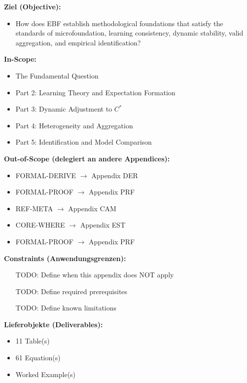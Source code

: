 \begin{tcolorbox}[
    colback=orange!5!white,
    colframe=orange!75!black,
    title={\textbf{Appendix Scope: Ziel / In-Scope / Out-of-Scope / Constraints}},
    fonttitle=\bfseries
]

\textbf{Ziel (Objective):}
\begin{itemize}[nosep]
    \item How does EBF establish methodological foundations that satisfy
the standards of microfoundation, learning consistency, dynamic stability,
valid aggregation, and empirical identification?
\end{itemize}

\textbf{In-Scope:}
\begin{itemize}[nosep]
    \item The Fundamental Question
    \item Part 2: Learning Theory and Expectation Formation
    \item Part 3: Dynamic Adjustment to $C^*$
    \item Part 4: Heterogeneity and Aggregation
    \item Part 5: Identification and Model Comparison
\end{itemize}

\textbf{Out-of-Scope (delegiert an andere Appendices):}
\begin{itemize}[nosep]
    \item FORMAL-DERIVE $\rightarrow$ Appendix DER
    \item FORMAL-PROOF $\rightarrow$ Appendix PRF
    \item REF-META $\rightarrow$ Appendix CAM
    \item CORE-WHERE $\rightarrow$ Appendix EST
    \item FORMAL-PROOF $\rightarrow$ Appendix PRF
\end{itemize}

\textbf{Constraints (Anwendungsgrenzen):}
\begin{itemize}[nosep]
    \item [TODO: Define when this appendix does NOT apply]
    \item [TODO: Define required prerequisites]
    \item [TODO: Define known limitations]
\end{itemize}

\textbf{Lieferobjekte (Deliverables):}
\begin{itemize}[nosep]
    \item 11 Table(s)
    \item 61 Equation(s)
    \item Worked Example(s)
\end{itemize}

\end{tcolorbox}


